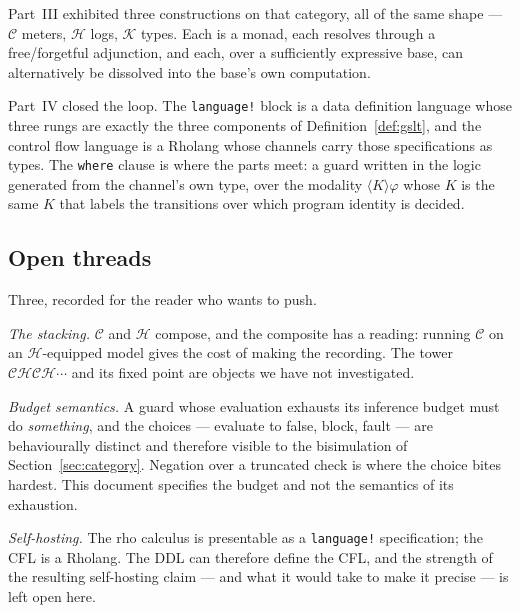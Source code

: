 \documentclass[11pt]{article}
\theoremstyle{definition}
\theoremstyle{plain}
\theoremstyle{remark}
\newcommand{\cost}{\mathcal{C}}
\newcommand{\hist}{\mathcal{H}}
\newcommand{\hyp}{\mathcal{K}}
\begin{document}
Part~III exhibited three constructions on that category, all of the same shape ---
$\cost$ meters, $\hist$ logs, $\hyp$ types. Each is a monad, each resolves through a
free/forgetful adjunction, and each, over a sufficiently expressive base, can alternatively
be dissolved into the base's own computation.

Part~IV closed the loop. The \texttt{language!} block is a data definition language whose
three rungs are exactly the three components of Definition~\ref{def:gslt}, and the control
flow language is a Rholang whose channels carry those specifications as types. The
\texttt{where} clause is where the parts meet: a guard written in the logic generated from
the channel's own type, over the modality $\langle K \rangle \varphi$ whose $K$ is the same
$K$ that labels the transitions over which program identity is decided.

\subsection*{Open threads}

Three, recorded for the reader who wants to push.

\emph{The stacking.} $\cost$ and $\hist$ compose, and the composite has a reading: running
$\cost$ on an $\hist$-equipped model gives the cost of making the recording. The tower
$\cost\hist\cost\hist\cdots$ and its fixed point are objects we have not investigated.

\emph{Budget semantics.} A guard whose evaluation exhausts its inference budget must do
\emph{something}, and the choices --- evaluate to false, block, fault --- are behaviourally
distinct and therefore visible to the bisimulation of Section~\ref{sec:category}. Negation
over a truncated check is where the choice bites hardest. This document specifies the
budget and not the semantics of its exhaustion.

\emph{Self-hosting.} The rho calculus is presentable as a \texttt{language!} specification;
the CFL is a Rholang. The DDL can therefore define the CFL, and the strength of the
resulting self-hosting claim --- and what it would take to make it precise --- is left
open here.
\end{document}
